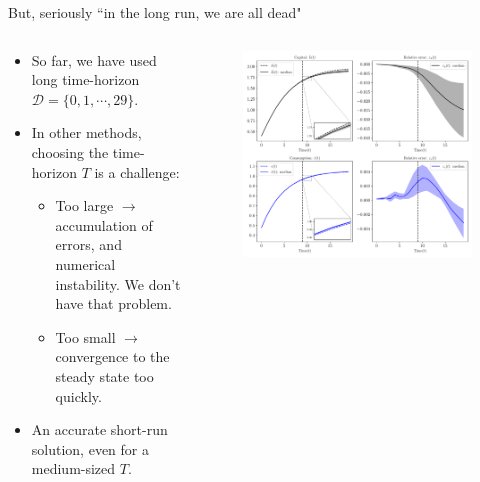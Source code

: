 \documentclass[aspectratio=169,10pt]{beamer}
\begin{document}
\begin{frame}{But, seriously ``in the long run, we are all dead"}

	\begin{columns}
	\begin{column}{0.5\textwidth}
		\begin{itemize}
			\item So far, we have used long time-horizon $\mathcal{D} = \{0,1,\cdots,29\}$.
			\vspace{0.05in}
			\item In other methods, choosing the time-horizon $T$ is a challenge:
			\begin{itemize}
					\item Too large $\rightarrow$ accumulation of errors, and numerical instability. We don't have that problem.
				\item Too small $\rightarrow$ convergence to the steady state too quickly.
			\end{itemize}
			 \vspace{0.05in}
			\item An accurate short-run solution, even for a medium-sized $T$.
		\end{itemize}
	\end{column}
	\begin{column}{0.5\textwidth}
		\begin{figure}[t!]
			\centering
			\includegraphics[width=\textwidth]{figs/growth_sequential_g0_t_max_9_ensemble.pdf}
			\vspace{-7mm}
		\end{figure}
	\end{column}
\end{columns}
\end{frame}
\end{document}
